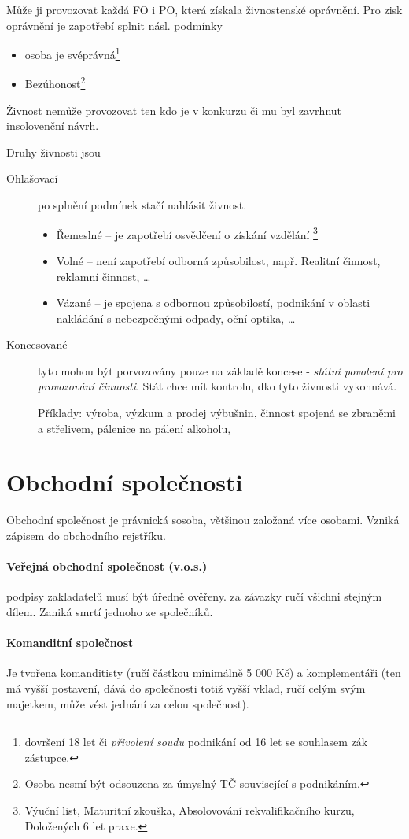 \documentclass[10pt,a4paper,
twoside,%
]{report}
\begin{document}
Může ji provozovat každá FO i PO, která získala živnostenské oprávnění. Pro zisk oprávnění je zapotřebí splnit násl. podmínky
\begin{multicols}{2}
\begin{itemize}
\item osoba je svéprávná\footnote{dovršení 18 let či \emph{přivolení soudu} podnikání od 16 let se souhlasem zák zástupce.}
\item Bezúhonost\footnote{Osoba nesmí být odsouzena za úmyslný TČ související s podnikáním.} 
\end{itemize}
\end{multicols}

Živnost nemůže provozovat ten kdo je v konkurzu či mu byl zavrhnut insolovenční návrh.

Druhy živnosti jsou 
\begin{description}
\item[Ohlašovací] po splnění podmínek stačí nahlásit živnost.
\begin{itemize}
\item Řemeslné -- je zapotřebí osvědčení o získání vzdělání \footnote{Výuční list, Maturitní zkouška, Absolovování rekvalifikačního kurzu, Doložených 6 let praxe.}
\item Volné -- není zapotřebí odborná způsobilost, např. \textsf{Realitní činnost, reklamní činnost, \dots}
\item Vázané -- je spojena s odbornou způsobilostí, podnikání v oblasti nakládání s nebezpečnými odpady, oční optika, \dots
\end{itemize}
\item[Koncesované] tyto mohou být porvozovány pouze na základě koncese - \emph{státní povolení pro provozování činnosti}. Stát chce mít kontrolu, dko tyto živnosti vykonnává.

Příklady: výroba, výzkum a prodej výbušnin, činnost spojená se zbraněmi a střelivem, pálenice na pálení alkoholu, 
\end{description}

\section{Obchodní společnosti}

Obchodní společnost je právnická sosoba, většinou založaná více osobami. Vzniká zápisem do obchodního rejstříku.

\paragraph{Veřejná obchodní společnost (v.o.s.)} podpisy zakladatelů musí být úředně ověřeny. za závazky ručí všichni stejným dílem. Zaniká smrtí jednoho ze společníků.

\paragraph{Komanditní společnost} Je tvořena komanditisty (ručí částkou minimálně 5 000 Kč) a komplementáři (ten má vyšší postavení, dává do společnosti totiž vyšší vklad, ručí celým svým majetkem, může vést jednání za celou společnost).
\end{document}
